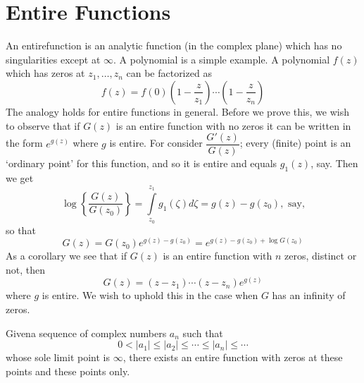 
\chapter{Entire Functions}\label{chap4}

An entire\pageoriginale function is an analytic function (in the
complex plane) which has no singularities except at $\infty$. A
polynomial is a simple example. A polynomial $f(z)$ which has zeros at
$z_1, \ldots , z_n$ can be factorized as 
$$
f(z) = f(0) \left(1 -\frac{z}{z_1} \right) \cdots
\left(1-\frac{z}{z_n} \right) 
$$
The analogy holds for entire functions in general. Before we prove
this, we wish to observe that if $G(z)$ is an entire function with no
zeros it can be written in the form $e^{g(z)}$ where $g$ is
entire. For consider $\dfrac{G'(z)}{G(z)}$; every (finite) point is an
`ordinary point' for this function, and so it is entire and equals
$g_1(z)$, say. Then we get
$$
\log \left\{\frac{G(z)}{G(z_0)} \right\} = \int\limits^{z_1}_{z_0} g_1
(\zeta) d \zeta = g(z) - g(z_0), \text{ say,}
$$
so that
$$
G(z) = G (z_0) e^{g(z)-g(z_0)} = e^{g(z) - g(z_0) + \log G(z_0) }
$$
As a corollary we see that if $G(z)$ is an entire function with $n$
zeros, distinct or not, then 
$$
G(z) = (z-z_1) \cdots (z-z_n) e^{g(z)}
$$
where $g$ is entire. We wish to uphold this in the case when $G$ has
an infinity of zeros.


\setcounter{thm}{0}
\begin{thm}[Weierstrass]\label{chap4:thm1}
\cite[p.\,246]{key15} Given\pageoriginale a sequence of complex numbers $a_n$
such that
$$
0 < |a_1| \leq |a_2| \leq \cdots \leq |a_n| \leq \cdots
$$
whose sole limit point is $\infty$, there exists an entire function
with zeros at these points and these points only.
\end{thm}

